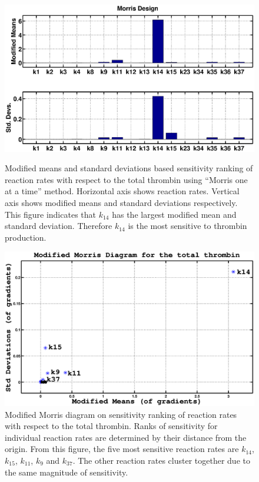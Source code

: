 \begin{figure}
  \begin{center}
    \includegraphics[width=5in]{figures/mean1.eps}
\caption{Modified means and standard deviations based sensitivity
ranking of reaction rates with respect to the total thrombin using
``Morris one at a time'' method. Horizontal axis shows reaction
rates. Vertical axis shows modified means and standard deviations
respectively. This figure indicates that $k_{14}$ has the largest
modified mean and standard deviation. Therefore $k_{14}$ is the most
sensitive to thrombin production. } \label{Fig:mmean}


    \includegraphics[width=5in]{figures/std.eps}
\caption{Modified Morris diagram on sensitivity ranking of reaction
rates with respect to the total thrombin. Ranks of sensitivity for
individual reaction rates are determined by their distance from the
origin. From this figure, the five most sensitive reaction rates are
$k_{14}$, $k_{15}$,  $k_{11}$, $k_{9}$ and $k_{37}$. The other
reaction rates cluster together due to the same magnitude of
sensitivity. } \label{Fig:std}


  \end{center}
\end{figure}

